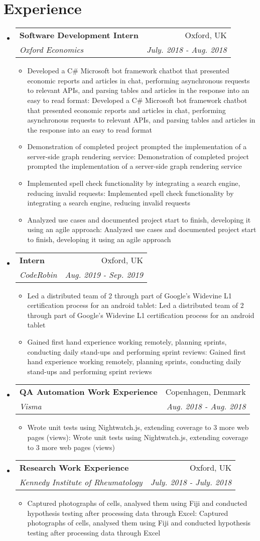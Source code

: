 \documentclass[a4paper,11pt]{article}
\makeatletter
\def \ifempty#1{\def\temp{#1} \ifx\temp\empty }
\newcommand{\resumeItem}[2]{
  \item\small{
  	\ifempty{#1}#2\else\textbf{#1}{: #2 \vspace{-2pt}}\fi
  }
}
\newcommand{\resumeSubheading}[4]{
  \vspace{-1pt}\item
    \begin{tabular*}{0.97\textwidth}{l@{\extracolsep{\fill}}r}
      \textbf{#1} & #2 \\
      \textit{\small#3} & \textit{\small #4} \\
    \end{tabular*}\vspace{-5pt}
}
\newcommand{\resumeSubHeadingListStart}{\begin{itemize}[leftmargin=*]}
\newcommand{\resumeSubHeadingListEnd}{\end{itemize}}
\newcommand{\resumeItemListStart}{\begin{itemize}}
\newcommand{\resumeItemListEnd}{\end{itemize}\vspace{-5pt}}
\makeatother
\begin{document}
\section{Experience}
  \resumeSubHeadingListStart
    \resumeSubheading
      {Software Development Intern}{Oxford, UK}
      {Oxford Economics}{July. 2018 - Aug. 2018}
      \resumeItemListStart
      	\resumeItem{}
          {Developed a C\# Microsoft bot framework chatbot that presented economic 
          reports and articles in chat, performing asynchronous requests to relevant APIs,
          and parsing tables and articles in the response into an easy to read format}
        \resumeItem{}
          {Demonstration of completed project prompted the 
          implementation of a server-side graph rendering service}
        \resumeItem{}  
          {Implemented spell check functionality by integrating a search 
          engine, reducing invalid requests}
        \resumeItem{}
          {Analyzed use cases and documented project start to finish, 
          developing it using an agile approach}
      \resumeItemListEnd
    \resumeSubheading
      {Intern}{Oxford, UK}
      {CodeRobin}{Aug. 2019 - Sep. 2019}
      \resumeItemListStart
      	\resumeItem{}
          {Led a distributed team of 2 through part of Google's Widevine L1 certification process 
          for an android tablet}
        \resumeItem{}
          {Gained first hand experience working remotely, planning sprints, conducting daily 
          stand-ups and performing sprint reviews}
      \resumeItemListEnd
    \resumeSubheading
      {QA Automation Work Experience}{Copenhagen, Denmark}
      {Visma}{Aug. 2018 - Aug. 2018}
      \resumeItemListStart
      	\resumeItem{}
          {Wrote unit tests using Nightwatch.js, extending coverage to 3 more web pages (views)}
      \resumeItemListEnd
    \resumeSubheading
      {Research Work Experience}{Oxford, UK}
      {Kennedy Institute of Rheumatology}{July. 2018 - July. 2018}
      \resumeItemListStart
      	\resumeItem{}
          {Captured photographs of cells, analysed them using Fiji and 
          conducted hypothesis testing after processing data through Excel}
      \resumeItemListEnd
    
  \resumeSubHeadingListEnd


\end{document}

